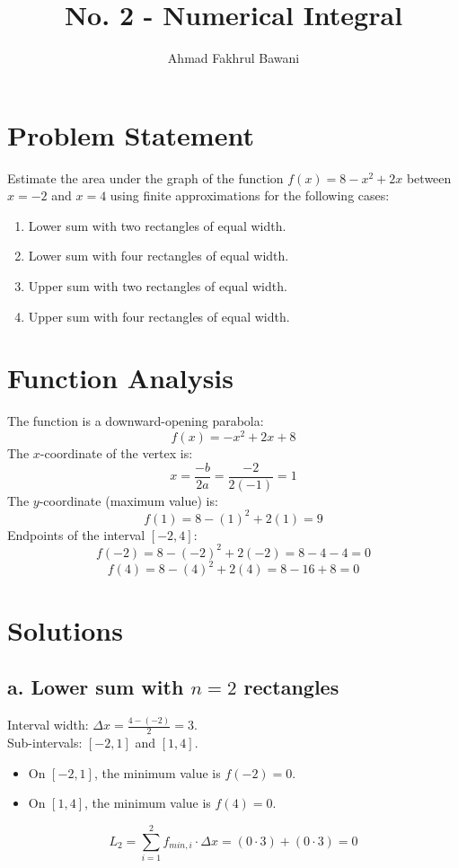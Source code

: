 \documentclass[12pt]{article}
\title{No. 2 - Numerical Integral}
\author{Ahmad Fakhrul Bawani}
\date{}
\begin{document}
\maketitle

\section*{Problem Statement}
Estimate the area under the graph of the function $f(x) = 8 - x^2 + 2x$ between $x = -2$ and $x = 4$ using finite approximations for the following cases:
\begin{enumerate}
    \item Lower sum with two rectangles of equal width.
    \item Lower sum with four rectangles of equal width.
    \item Upper sum with two rectangles of equal width.
    \item Upper sum with four rectangles of equal width.
\end{enumerate}

\section*{Function Analysis}
The function is a downward-opening parabola:
\[ f(x) = -x^2 + 2x + 8 \]
The $x$-coordinate of the vertex is:
\[ x = \frac{-b}{2a} = \frac{-2}{2(-1)} = 1 \]
The $y$-coordinate (maximum value) is:
\[ f(1) = 8 - (1)^2 + 2(1) = 9 \]
Endpoints of the interval $[-2, 4]$:
\[ f(-2) = 8 - (-2)^2 + 2(-2) = 8 - 4 - 4 = 0 \]
\[ f(4) = 8 - (4)^2 + 2(4) = 8 - 16 + 8 = 0 \]

\section*{Solutions}

\subsection*{a. Lower sum with $n=2$ rectangles}
Interval width: $\Delta x = \frac{4 - (-2)}{2} = 3$. \\
Sub-intervals: $[-2, 1]$ and $[1, 4]$.
\begin{itemize}
    \item On $[-2, 1]$, the minimum value is $f(-2) = 0$.
    \item On $[1, 4]$, the minimum value is $f(4) = 0$.
\end{itemize}
\[ L_2 = \sum_{i=1}^{2} f_{min, i} \cdot \Delta x = (0 \cdot 3) + (0 \cdot 3) = 0 \]
\end{document}

